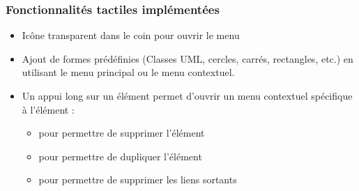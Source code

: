 \newpage
\subsubsection{Fonctionnalités tactiles implémentées}
\begin{itemize}
\item Icône transparent dans le coin pour ouvrir le menu
\item Ajout de formes prédéfinies (Classes UML, cercles, carrés, rectangles, etc.) en utilisant le menu principal ou le menu contextuel.
\item Un appui long sur un élément permet d'ouvrir un menu contextuel spécifique à l'élément :
\begin{itemize}
	\item pour permettre de supprimer l'élément
	\item pour permettre de dupliquer l'élément
	\item pour permettre de supprimer les liens sortants
\end{itemize}


\end{itemize}
